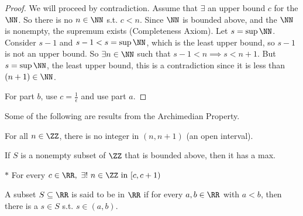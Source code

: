 \documentclass[12pt]{scrartcl}
\begin{document}
\begin{proof}
  
  We will proceed by contradiction. Assume that $\exists$ an upper bound $c$ for the 
  $\NN$. So there is no $n \in \NN$ s.t. $c < n$. Since $\NN$ is bounded above, and 
  the $\NN$ is nonempty, the supremum exists (Completeness Axiom). 
  Let $s = \sup \NN$. Consider $s - 1$ and $s - 1 < s = \sup \NN$, which is the least
  upper bound, so $s - 1$ is not an upper bound. So $\exists n \in \NN$ such that $s - 1 < n \implies 
  s < n + 1$. But $s = \sup \NN$, the least upper bound, this is a contradiction since it 
  is less than $(n + 1) \in \NN$. 
  
  For part $b$, use $c = \frac{1}{\epsilon}$ and use part $a$. 
\end{proof}

\begin{note}
  Some of the following are results from the Archimedian Property. 

  \begin{theorem}
    For all $n \in \ZZ$, there is no integer in $(n, n + 1)$ (an open interval).
  \end{theorem}

  \begin{theorem}
    If $S$ is a nonempty subset of $\ZZ$ that is bounded above, then it has a max. 
  \end{theorem}

  \begin{theorem}
    $*$ For every $c \in \RR, \ \exists ! \ n \in \ZZ \text{ in } [c, c + 1)$
  \end{theorem}

\end{note}

\begin{definition}
  A subset $S \subseteq \RR$ is said to be  in $\RR$ if for every $a, b \in \RR$
  with $a < b$, then there is a $s \in S$ s.t. $s \in (a, b)$.
\end{definition}
\end{document}

